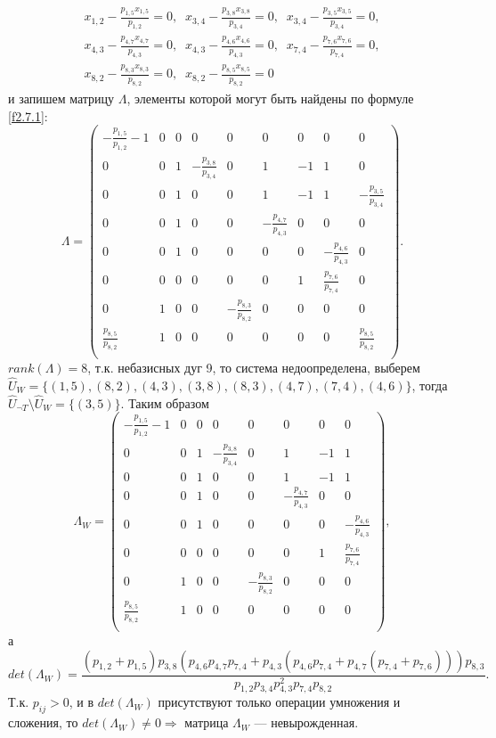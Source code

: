 \documentclass[14pt]{extarticle}%
\begin{document}
\begin{equation}\label{f3.1.23}
\begin{gathered}
x_{1,2}-\frac{p_{1,5} x_{1,5}}{p_{1,2}}=0,\;\;
x_{3,4}-\frac{p_{3,8} x_{3,8}}{p_{3,4}}=0,\;\;
x_{3,4}-\frac{p_{3,5} x_{3,5}}{p_{3,4}}=0,\\
x_{4,3}-\frac{p_{4,7} x_{4,7}}{p_{4,3}}=0,\;\;
x_{4,3}-\frac{p_{4,6} x_{4,6}}{p_{4,3}}=0,\;\;
x_{7,4}-\frac{p_{7,6} x_{7,6}}{p_{7,4}}=0,\\
x_{8,2}-\frac{p_{8,3} x_{8,3}}{p_{8,2}}=0,\;\;
x_{8,2}-\frac{p_{8,5} x_{8,5}}{p_{8,2}}=0
\end{gathered}
\end{equation}
и запишем матрицу $\Lambda$, элементы которой могут быть найдены по формуле \eqref{f2.7.1}:
$$
\Lambda=\left(
\begin{array}{ccccccccc}
 -\frac{p_{1,5}}{p_{1,2}}-1 & 0 & 0 & 0 & 0 & 0 & 0 & 0 & 0 \\
 0 & 0 & 1 & -\frac{p_{3,8}}{p_{3,4}} & 0 & 1 & -1 & 1 & 0 \\
 0 & 0 & 1 & 0 & 0 & 1 & -1 & 1 & -\frac{p_{3,5}}{p_{3,4}} \\
 0 & 0 & 1 & 0 & 0 & -\frac{p_{4,7}}{p_{4,3}} & 0 & 0 & 0 \\
 0 & 0 & 1 & 0 & 0 & 0 & 0 & -\frac{p_{4,6}}{p_{4,3}} & 0 \\
 0 & 0 & 0 & 0 & 0 & 0 & 1 & \frac{p_{7,6}}{p_{7,4}} & 0 \\
 0 & 1 & 0 & 0 & -\frac{p_{8,3}}{p_{8,2}} & 0 & 0 & 0 & 0 \\
 \frac{p_{8,5}}{p_{8,2}} & 1 & 0 & 0 & 0 & 0 & 0 & 0 & \frac{p_{8,5}}{p_{8,2}} \\
\end{array}
\right).
$$
$rank(\Lambda)=8$, т.к. небазисных дуг 9, то система недоопределена, выберем $\widehat{U}_W=\{(1 , 5), (8 , 2), (4 , 3), (3, 8), (8 , 3), (4 , 7), (7 , 4), (4 , 6)\}$, тогда $\widehat{U}_{\neg T}\setminus\widehat{U}_W=\{(3,5)\}$. Таким образом 
$$\Lambda_W=\left(
\begin{array}{cccccccc}
 -\frac{p_{1,5}}{p_{1,2}}-1 & 0 & 0 & 0 & 0 & 0 & 0 & 0 \\
 0 & 0 & 1 & -\frac{p_{3,8}}{p_{3,4}} & 0 & 1 & -1 & 1 \\
 0 & 0 & 1 & 0 & 0 & 1 & -1 & 1 \\
 0 & 0 & 1 & 0 & 0 & -\frac{p_{4,7}}{p_{4,3}} & 0 & 0 \\
 0 & 0 & 1 & 0 & 0 & 0 & 0 & -\frac{p_{4,6}}{p_{4,3}} \\
 0 & 0 & 0 & 0 & 0 & 0 & 1 & \frac{p_{7,6}}{p_{7,4}} \\
 0 & 1 & 0 & 0 & -\frac{p_{8,3}}{p_{8,2}} & 0 & 0 & 0 \\
 \frac{p_{8,5}}{p_{8,2}} & 1 & 0 & 0 & 0 & 0 & 0 & 0 \\
\end{array}
\right),$$
а 
$$det(\Lambda_W)=\frac{\left(p_{1,2}+p_{1,5}\right) p_{3,8} \left(p_{4,6} p_{4,7} p_{7,4}+p_{4,3} \left(p_{4,6} p_{7,4}+p_{4,7} \left(p_{7,4}+p_{7,6}\right)\right)\right) p_{8,3}}{p_{1,2} p_{3,4} p_{4,3}^2 p_{7,4} p_{8,2}}.$$
Т.к. $p_{ij}>0$, и в $det(\Lambda_W)$ присутствуют только операции умножения и сложения, то  $det(\Lambda_W)\neq 0 \Rightarrow$ матрица $\Lambda_W$ --- невырожденная. 
\end{document}
